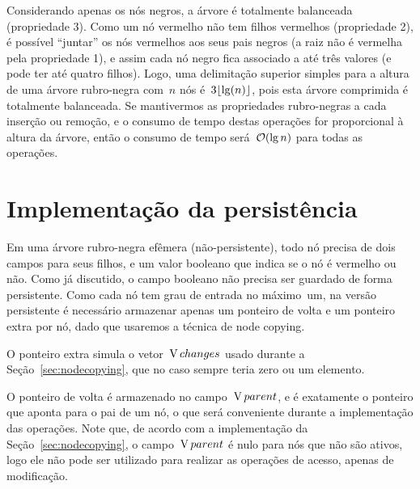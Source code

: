 \documentclass[main.tex]{subfiles}
\begin{document}
Considerando apenas os nós negros, a árvore é totalmente balanceada (propriedade 3). Como um nó vermelho não tem filhos vermelhos (propriedade 2), é possível ``juntar'' os nós vermelhos aos seus pais negros (a raiz não é vermelha pela propriedade 1), e assim cada nó negro fica associado a até três valores (e pode ter até quatro filhos). Logo, uma delimitação superior simples para a altura de uma árvore rubro-negra com~$n$ nós é~$3\lfloor\lg(n)\rfloor$, pois esta árvore comprimida é totalmente balanceada. Se mantivermos as propriedades rubro-negras a cada inserção ou remoção, e o consumo de tempo destas operações for proporcional à altura da árvore, então o consumo de tempo será~$\mathcal{O}(\lg n)$ para todas as operações.

\section{Implementação da persistência}

\newcommand{\ts}{\mathcal{T}}
\newcommand{\cp}{\V{copy}}
\newcommand{\child}{\V{child}}
\newcommand{\parent}{\V{parent}}
\newcommand{\red}{\V{red}}
\newcommand{\extra}{\V{extra}}
\newcommand{\eSide}{\V{extraSide}}
\newcommand{\eTs}{\V{extra\mathcal{T}}}
\newcommand{\version}{\V{version}}
\newcommand{\side}{\V{side}}
\newcommand{\roots}{\V{roots}}
\newcommand{\val}{\V{value}}
\newcommand{\cur}{\V{current}}


Em uma árvore rubro-negra efêmera (não-persistente), todo nó precisa de dois campos para seus filhos, e um valor booleano que indica se o nó é vermelho ou não. Como já discutido, o campo booleano não precisa ser guardado de forma persistente. Como cada nó tem grau de entrada no máximo~um, na versão persistente é necessário armazenar apenas um ponteiro de volta e um ponteiro extra por nó, dado que usaremos a técnica de node copying.

O ponteiro extra simula o vetor~$\operatorname{V}{changes}$ usado durante a Seção~\ref{sec:nodecopying}, que no caso sempre teria zero ou um elemento.

O ponteiro de volta é armazenado no campo~$\parent$, e é exatamente o ponteiro que aponta para o pai de um nó, o que será conveniente durante a implementação das operações. Note que, de acordo com a implementação da Seção~\ref{sec:nodecopying}, o campo~$\parent$ é nulo para nós que não são ativos, logo ele não pode ser utilizado para realizar as operações de acesso, apenas de modificação.
\end{document}
